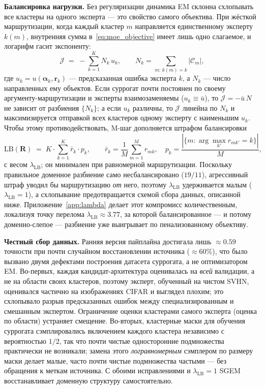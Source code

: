 \textbf{Балансировка нагрузки.} Без регуляризации динамика EM склонна
схлопывать все кластеры на одного эксперта --- это свойство самого
объектива. При жёсткой маршрутизации, когда каждый кластер $m$
направляется единственному эксперту $k(m)$, внутренняя сумма
в~\eqref{eq:moe_objective} имеет лишь одно слагаемое, и логарифм гасит
экспоненту:
\begin{equation}
\label{eq:hard_objective}
\mathcal{J} \;=\; -\sum_{k=1}^{K} N_k\, u_k,
\qquad N_k = \!\!\sum_{m:\,k(m)=k}\!\! |\mathcal{C}_m|,
\end{equation}
где $u_k = u(\boldsymbol{\alpha}_k, \mathbf{r}_k)$ --- предсказанная
ошибка эксперта $k$, а $N_k$ --- число направленных ему объектов. Если
суррогат почти постоянен по своему аргументу-маршрутизации и эксперты
взаимозаменяемы ($u_k \equiv \bar u$), то $\mathcal{J} = -\bar u\, N$ не
зависит от разбиения $\{N_k\}$; а если $u_k$ различны, то $\mathcal{J}$
линейна по $N_k$ и максимизируется отправкой всех кластеров одному
эксперту с наименьшим $u_k$. Чтобы этому противодействовать, M-шаг
дополняется штрафом балансировки
\begin{equation}
\label{eq:loadbalance}
\mathrm{LB}(\mathbf{R}) \;=\; K \cdot \sum_{k=1}^{K}\bar{r}_k \cdot p_k,
\qquad
\bar{r}_k = \frac{1}{M}\sum_{m=1}^{M} r_{mk}, \quad
p_k = \frac{|\{m : \arg\max_{k'} r_{mk'} = k\}|}{M},
\end{equation}
с весом $\lambda_{\text{LB}}$; он минимален при равномерной маршрутизации.
Поскольку правильное доменное разбиение само несбалансировано ($19/11$),
агрессивный штраф уводил бы маршрутизацию \emph{от} него, поэтому
$\lambda_{\text{LB}}$ удерживается малым ($\lambda_{\text{LB}} = 1$), а
схлопывание предотвращается схемой сбора данных, описанной ниже.
Приложение~\ref{app:lambda} делает этот компромисс количественным,
локализуя точку перелома $\lambda_{\text{LB}} \approx 3.77$, за которой
балансированное --- и потому доменно-слепое --- разбиение уже выигрывает
по пенализованному объективу.

\textbf{Честный сбор данных.} Ранняя версия пайплайна достигала лишь
$\approx\!0.59$ точности при почти случайном восстановлении источника
($\approx\!60\%$), что было вызвано двумя дефектами построения датасета
суррогата, а не оптимизатором EM. Во-первых, каждая
кандидат-архитектура оценивалась на \emph{всей} валидации, а не на
области своих кластеров, поэтому эксперт, обученный на чистом SVHN,
оценивался частично на изображениях CIFAR и выглядел плохим; это
схлопывало разрыв предсказанных ошибок между специализированным и
смешанным экспертом. Ограничение оценки кластерами самого эксперта
(оценка по области) устраняет смещение. Во-вторых, кластерные маски для
обучения суррогата сэмплировались включением каждого кластера независимо
с вероятностью $1/2$, так что почти чистые односторонние подмножества
практически не возникали; замена этого \emph{логравномерным} сэмплером по
размеру маски делает малые, часто почти чистые подмножества частыми ---
без обращения к меткам источника. С обоими исправлениями и
$\lambda_{\text{LB}} = 1$ SGEM восстанавливает доменную структуру
самостоятельно.

